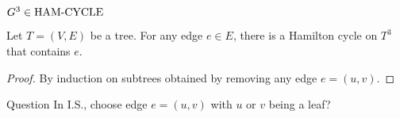 \begin{frame}{$G^3 \in \text{HAM-CYCLE}$}
  \begin{theorem}[$T^3 \in \hc$]
	Let $T = (V, E)$ be a tree. For any edge $e \in E$, there is a Hamilton cycle on $T^3$ that contains $e$.
  \end{theorem}

  \begin{proof}
	\centerline{By induction on subtrees obtained by removing any edge $e = (u,v)$.}
  \end{proof}

  \begin{alertblock}{Question}
	In I.S., choose edge $e = (u,v)$ with $u$ or $v$ being a leaf?
  \end{alertblock}
\end{frame}
